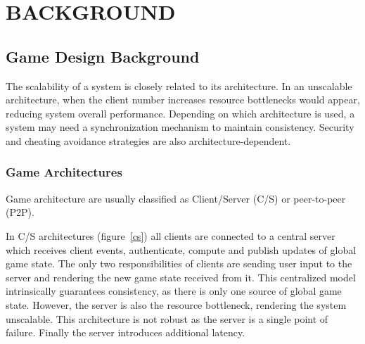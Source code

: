 \documentclass{sigchi}
\newcommand{\cs}{C\slash S}
\begin{document}
\section{BACKGROUND}
\label{background}


\subsection{Game Design Background}
\label{gamedesignbg}

The scalability of a system is closely related to its architecture. In an unscalable architecture, when the client number increases resource bottlenecks would appear, reducing system overall performance. Depending on which architecture is used, a system may need a synchronization mechanism to maintain consistency. Security and cheating avoidance strategies are also architecture-dependent.

\subsubsection{Game Architectures}
\label{game_archi}

Game architecture are usually classified as Client\slash Server (\cs) or peer-to-peer (P2P). 

In {\cs} architectures (figure~\ref{cs}) all clients are connected to a central server which receives client events, authenticate, compute and publish updates of global game state. The only two responsibilities of clients are sending user input to the server and rendering the new game state received from it. This centralized model intrinsically guarantees consistency, as there is only one source of global game state. However, the server is also the resource bottleneck, rendering the system unscalable. This architecture is not robust as the server is a single point of failure. Finally the server introduces additional latency.
\end{document}
